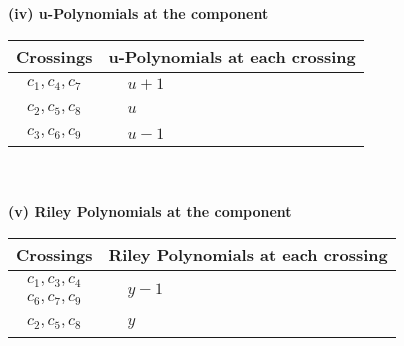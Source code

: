 \documentclass[1p]{elsarticle_modified}
\theoremstyle{definition}
\begin{document}
\newpage\renewcommand{\arraystretch}{1}
\flushleft \textbf{(iv) u-Polynomials at the component}\newline \\
\begin{tabular}{m{50pt}|m{274pt}}
Crossings & \hspace{64pt}u-Polynomials at each crossing \\
\hline $$\begin{aligned}c_{1},c_{4},c_{7}\end{aligned}$$&$\begin{aligned}
&u+1
\end{aligned}$\\
\hline $$\begin{aligned}c_{2},c_{5},c_{8}\end{aligned}$$&$\begin{aligned}
&u
\end{aligned}$\\
\hline $$\begin{aligned}c_{3},c_{6},c_{9}\end{aligned}$$&$\begin{aligned}
&u-1
\end{aligned}$\\
\hline
\end{tabular}\\~\\
\newpage\renewcommand{\arraystretch}{1}
\flushleft \textbf{(v) Riley Polynomials at the component}\newline \\
\begin{tabular}{m{50pt}|m{274pt}}
Crossings & \hspace{64pt}Riley Polynomials at each crossing \\
\hline $$\begin{aligned}c_{1},c_{3},c_{4}\\c_{6},c_{7},c_{9}\end{aligned}$$&$\begin{aligned}
&y-1
\end{aligned}$\\
\hline $$\begin{aligned}c_{2},c_{5},c_{8}\end{aligned}$$&$\begin{aligned}
&y
\end{aligned}$\\
\hline
\end{tabular}\\~\\
\end{document}

